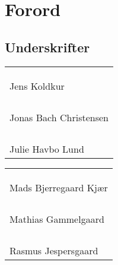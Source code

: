 \chapter*{Forord}
 


\section*{Underskrifter}
\begin{center}
\begin{minipage}[b]{0.45\textwidth}
\begin{center}
\begin{tabular}{l}
\phantom{Julie er virkelig dejlig, sød og smuk} \\
\\
\\
\hline
Jens Koldkur \\
\\
\\
\\
\\
\hline
Jonas Bach Christensen \\
\\
\\
\\
\\
\hline
Julie Havbo Lund \\         
\end{tabular}
\end{center}
\end{minipage}
%
\begin{minipage}[b]{0.038\textwidth}
\phantom{xD}
\end{minipage}
\begin{minipage}[b]{0.45\textwidth}
\begin{center}
\begin{tabular}{l}
\phantom{Julieervirkeligdejligogsødogsmukogs} \\
\\
\\
\hline
Mads Bjerregaard Kjær \\
\\
\\
\\
\\
\hline
Mathias Gammelgaard \\
\\
\\
\\
\\
\hline
Rasmus Jespersgaard \\         
\end{tabular}
\end{center}
\end{minipage}
\end{center}